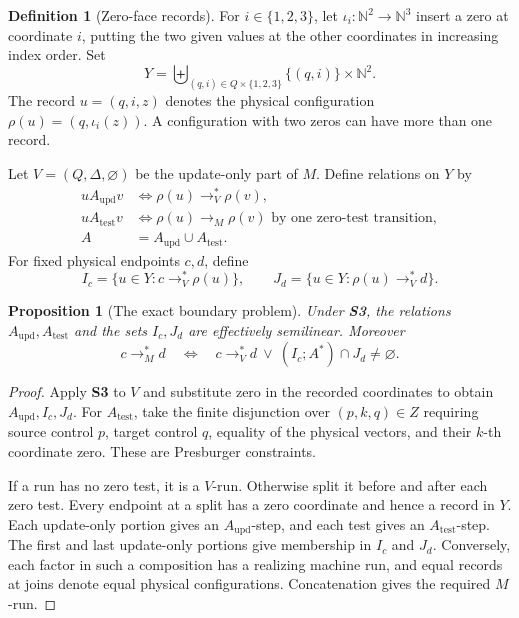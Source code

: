 \documentclass[11pt,a4paper]{article}
\newtheorem{proposition}[theorem]{Proposition}
\theoremstyle{definition}
\newtheorem{definition}[theorem]{Definition}
\theoremstyle{remark}
\newcommand{\N}{\mathbb N}
\begin{document}
\begin{definition}[Zero-face records]
\label{def:zero-face}
For \(i\in\{1,2,3\}\), let
\(\iota_i:\N^2\to\N^3\) insert a zero at coordinate \(i\), putting the
two given values at the other coordinates in increasing index order.
Set
\[
 Y=\biguplus_{(q,i)\in Q\times\{1,2,3\}}
       \{(q,i)\}\times\N^2.
\]
The record \(u=(q,i,z)\) denotes the physical configuration
\(\rho(u)=(q,\iota_i(z))\). A configuration with two zeros can have
more than one record.

Let \(V=(Q,\Delta,\varnothing)\) be the update-only part of \(M\).
Define relations on \(Y\) by
\[
\begin{split}
 uA_{\mathrm{upd}}v
 &\iff \rho(u)\longrightarrow_V^*\rho(v),\\
 uA_{\mathrm{test}}v
 &\iff \rho(u)\longrightarrow_M\rho(v)
       \text{ by one zero-test transition},\\
 A&=A_{\mathrm{upd}}\cup A_{\mathrm{test}}.
\end{split}
\]
For fixed physical endpoints \(c,d\), define
\[
 I_c=\{u\in Y:c\longrightarrow_V^*\rho(u)\},
 \qquad
 J_d=\{u\in Y:\rho(u)\longrightarrow_V^*d\}.
\]
\end{definition}

\begin{proposition}[The exact boundary problem]
\label{prop:boundary}
Under \textbf{S3}, the relations \(A_{\mathrm{upd}},A_{\mathrm{test}}\)
and the sets \(I_c,J_d\) are effectively semilinear. Moreover
\begin{equation}
 c\longrightarrow_M^*d
 \quad\Longleftrightarrow\quad
 c\longrightarrow_V^*d
 \ \lor\
 (I_c;A^*)\cap J_d\ne\varnothing.
 \label{eq:raw-boundary}
\end{equation}
\end{proposition}
\begin{proof}
Apply \textbf{S3} to \(V\) and substitute zero in the recorded
coordinates to obtain \(A_{\mathrm{upd}},I_c,J_d\).
For \(A_{\mathrm{test}}\), take the finite disjunction over
\((p,k,q)\in Z\) requiring source control \(p\), target control \(q\),
equality of the physical vectors, and their \(k\)-th coordinate zero.
These are Presburger constraints.

If a run has no zero test, it is a \(V\)-run. Otherwise split it before
and after each zero test. Every endpoint at a split has a zero
coordinate and hence a record in \(Y\). Each update-only portion gives
an \(A_{\mathrm{upd}}\)-step, and each test gives an
\(A_{\mathrm{test}}\)-step. The first and last update-only portions
give membership in \(I_c\) and \(J_d\).
Conversely, each factor in such a composition has a realizing machine
run, and equal records at joins denote equal physical configurations.
Concatenation gives the required \(M\)-run.
\end{proof}
\end{document}
